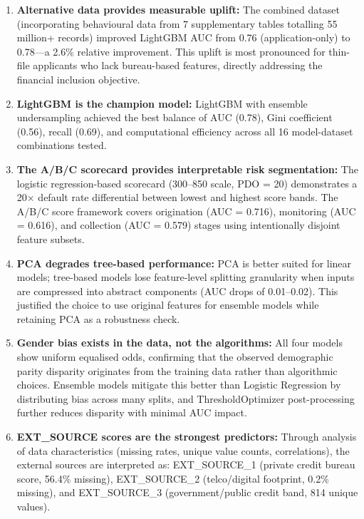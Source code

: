 \begin{enumerate}
    \item \textbf{Alternative data provides measurable uplift:} The combined dataset (incorporating behavioural data from 7 supplementary tables totalling 55 million+ records) improved LightGBM AUC from 0.76 (application-only) to 0.78---a 2.6\% relative improvement. This uplift is most pronounced for thin-file applicants who lack bureau-based features, directly addressing the financial inclusion objective.

    \item \textbf{LightGBM is the champion model:} LightGBM with ensemble undersampling achieved the best balance of AUC (0.78), Gini coefficient (0.56), recall (0.69), and computational efficiency across all 16 model-dataset combinations tested.

    \item \textbf{The A/B/C scorecard provides interpretable risk segmentation:} The logistic regression-based scorecard (300--850 scale, PDO = 20) demonstrates a 20$\times$ default rate differential between lowest and highest score bands. The A/B/C score framework covers origination (AUC = 0.716), monitoring (AUC = 0.616), and collection (AUC = 0.579) stages using intentionally disjoint feature subsets.

    \item \textbf{PCA degrades tree-based performance:} PCA is better suited for linear models; tree-based models lose feature-level splitting granularity when inputs are compressed into abstract components (AUC drops of 0.01--0.02). This justified the choice to use original features for ensemble models while retaining PCA as a robustness check.

    \item \textbf{Gender bias exists in the data, not the algorithms:} All four models show uniform equalised odds, confirming that the observed demographic parity disparity originates from the training data rather than algorithmic choices. Ensemble models mitigate this better than Logistic Regression by distributing bias across many splits, and ThresholdOptimizer post-processing further reduces disparity with minimal AUC impact.

    \item \textbf{EXT\_SOURCE scores are the strongest predictors:} Through analysis of data characteristics (missing rates, unique value counts, correlations), the external sources are interpreted as: EXT\_SOURCE\_1 (private credit bureau score, 56.4\% missing), EXT\_SOURCE\_2 (telco/digital footprint, 0.2\% missing), and EXT\_SOURCE\_3 (government/public credit band, 814 unique values).
\end{enumerate}

